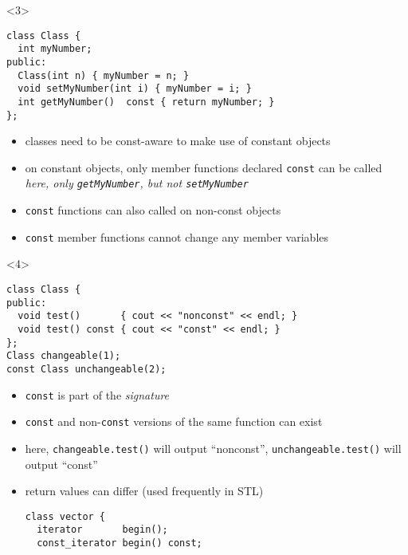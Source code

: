 \documentclass{slides}
\begin{document}
\begin{frame}[fragile]
\begin{onlyenv}
  \end{onlyenv}

  \begin{onlyenv}<3>
\begin{lstlisting}[emph={const}]
class Class {
  int myNumber;
public:
  Class(int n) { myNumber = n; }
  void setMyNumber(int i) { myNumber = i; }
  int getMyNumber()  const { return myNumber; }
};
\end{lstlisting}
    
    \begin{itemize}
    \item classes need to be \alert{const-aware} to make use of constant objects
    \item on constant objects, only member functions declared
      \lstinline!const! can be called\\
      \emph{here, only \lstinline!getMyNumber!, but not \lstinline!setMyNumber!}
    \item \lstinline!const! functions can also called on non-const objects
    \item \lstinline!const! member functions cannot change
      any member variables
    \end{itemize}
  \end{onlyenv}

  \begin{onlyenv}<4>
\begin{lstlisting}[emph={const}]
class Class {
public:
  void test()       { cout << "nonconst" << endl; }
  void test() const { cout << "const" << endl; }
};
Class changeable(1);
const Class unchangeable(2);
\end{lstlisting}

    \begin{itemize}
    \item \lstinline!const! is part of the \emph{signature}
    \item \lstinline!const! and non-\lstinline!const! versions of the
      same function can exist
    \item here, \lstinline!changeable.test()! will output
      ``nonconst'', \lstinline!unchangeable.test()! will output
      ``const''
    \item return values can differ (used frequently in STL)
\begin{lstlisting}
class vector {
  iterator       begin();
  const_iterator begin() const;
\end{lstlisting}
    \end{itemize}
  \end{onlyenv}


\end{frame}
\end{document}
